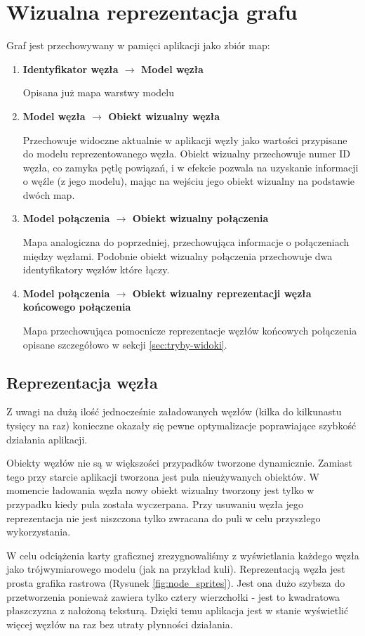 \section{Wizualna reprezentacja grafu}
\label{sec:graf-reprezentacja}

\newcommand\mapitem[3]{
	\item \textbf{#1 $\to$ #2}

	#3
}

\noindent
Graf jest przechowywany w pamięci aplikacji jako zbiór map:
\begin{enumerate}[label=\textbullet]
	\mapitem{Identyfikator węzła}{Model węzła}{Opisana już mapa warstwy modelu}
	\mapitem{Model węzła}{Obiekt wizualny węzła}{Przechowuje widoczne aktualnie w aplikacji węzły jako wartości przypisane do modelu reprezentowanego węzła. Obiekt wizualny przechowuje numer ID węzła, co zamyka pętlę powiązań, i w efekcie pozwala na uzyskanie informacji o węźle (z jego modelu), mając na wejściu jego obiekt wizualny na podstawie dwóch map.}
	\mapitem{Model połączenia}{Obiekt wizualny połączenia}{Mapa analogiczna do poprzedniej, przechowująca informacje o połączeniach między węzłami. Podobnie obiekt wizualny połączenia przechowuje dwa identyfikatory węzłów które łączy.}
	
	\mapitem{Model połączenia}{Obiekt wizualny reprezentacji węzła końcowego połączenia}{Mapa przechowująca pomocnicze reprezentacje węzłów końcowych połączenia opisane szczegółowo w sekcji \ref{sec:tryby-widoki}.}
\end{enumerate}

\subsection{Reprezentacja węzła} Z uwagi na dużą ilość jednocześnie załadowanych węzłów (kilka do kilkunastu tysięcy na raz) konieczne okazały się pewne optymalizacje poprawiające szybkość działania aplikacji. 

Obiekty węzłów nie są w większości przypadków tworzone dynamicznie. Zamiast tego przy starcie aplikacji tworzona jest pula nieużywanych obiektów. W momencie ładowania węzła nowy obiekt wizualny tworzony jest tylko w przypadku kiedy pula została wyczerpana. Przy usuwaniu węzła jego reprezentacja nie jest niszczona tylko zwracana do puli w celu przyszłego wykorzystania.

W celu odciążenia karty graficznej zrezygnowaliśmy z wyświetlania każdego węzła jako trójwymiarowego modelu (jak na przykład kuli). Reprezentacją węzła jest prosta grafika rastrowa (Rysunek \ref{fig:node_sprites}). Jest ona dużo szybsza do przetworzenia ponieważ zawiera tylko cztery wierzchołki - jest to kwadratowa płaszczyzna z nałożoną teksturą. Dzięki temu aplikacja jest w stanie wyświetlić więcej węzłów na raz bez utraty płynności działania.

